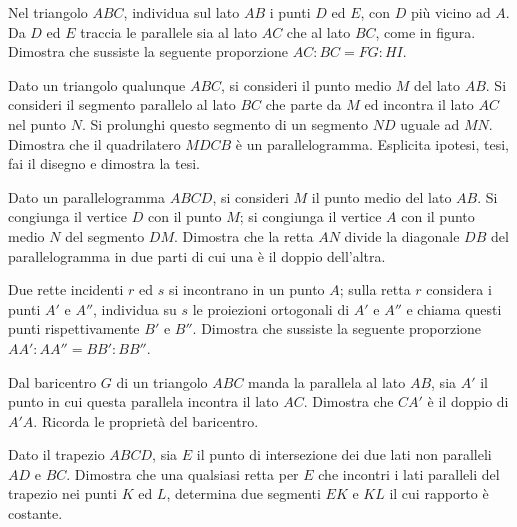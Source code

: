 \begin{multicols}{2}

\begin{esercizio}
\label{ese:6.35}
Nel triangolo $ABC$, individua sul lato $AB$ i punti $D$ ed $E$, con $D$ più vicino ad $A$. Da $D$ ed $E$ traccia le parallele sia al lato $AC$ che al lato $BC$, come in figura. Dimostra che sussiste la seguente proporzione $AC:BC=FG:HI$.
\end{esercizio}

\begin{esercizio}
\label{ese:6.36}
Dato un triangolo qualunque $ABC$, si consideri il punto medio $M$ del lato $AB$. Si consideri il segmento parallelo al lato $BC$ che parte da $M$ ed incontra il lato $AC$ nel punto $N$. Si prolunghi questo segmento di un segmento $ND$ uguale ad $MN$. Dimostra che il quadrilatero $MDCB$ è un parallelogramma. Esplicita ipotesi, tesi, fai il disegno e dimostra la tesi.
\end{esercizio}

\begin{esercizio}
\label{ese:6.37}
Dato un parallelogramma $ABCD$, si consideri $M$ il punto medio del lato $AB$. Si congiunga il vertice $D$ con il punto $M$; si congiunga il vertice $A$ con il punto medio $N$ del segmento $DM$. Dimostra che la retta $AN$ divide la diagonale $DB$ del parallelogramma in due parti di cui una è il doppio dell'altra.
\end{esercizio}

\begin{esercizio}
\label{ese:6.38}
Due rette incidenti $r$ ed $s$ si incontrano in un punto $A$; sulla retta $r$ considera i punti $A'$ e $A''$, individua su $s$ le proiezioni ortogonali di $A'$ e $A''$ e chiama questi punti rispettivamente $B'$ e $B''$. Dimostra che sussiste la seguente proporzione $AA' : AA'' = BB' : BB''$.
\end{esercizio}

\begin{esercizio}
\label{ese:6.39}
Dal baricentro $G$ di un triangolo $ABC$ manda la parallela al lato $AB$, sia $A'$ il punto in cui questa parallela incontra il lato $AC$. Dimostra che $CA'$ è il doppio di $A'A$. Ricorda le proprietà del baricentro.
\end{esercizio}

\begin{esercizio}
\label{ese:6.40}
Dato il trapezio $ABCD$, sia $E$ il punto di intersezione dei due lati non paralleli $AD$ e $BC$. Dimostra che una qualsiasi retta per $E$ che incontri i lati paralleli del trapezio nei punti $K$ ed $L$, determina due segmenti $EK$ e $KL$ il cui rapporto è costante.
\end{esercizio}


\end{multicols}
